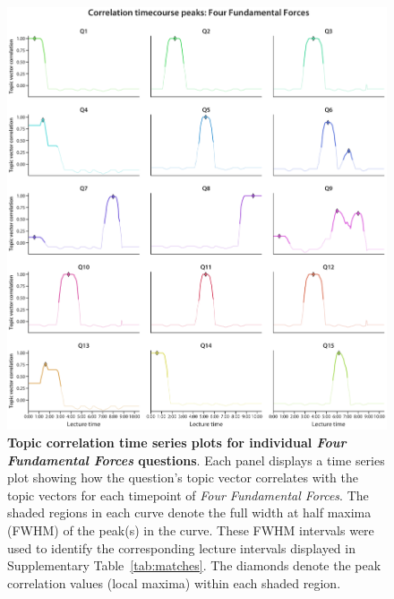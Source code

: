 \documentclass[10pt]{article}
\begin{document}
\begin{figure}[tp]
    \centering
    \includegraphics[width=\textwidth]{figs/forces-qcorrs-peaks}

    \caption{\textbf{Topic correlation time series plots for individual
    \textit{Four Fundamental Forces} questions}. Each panel displays a
    time series plot showing how the question's topic vector correlates with the
    topic vectors for each timepoint of \textit{Four Fundamental Forces}. The
    shaded regions in each curve denote the full width at half maxima (FWHM)
    of the peak(s) in the curve. These FWHM intervals were used to identify the
    corresponding lecture intervals displayed in Supplementary
    Table~\ref{tab:matches}. The diamonds denote the peak correlation values
    (local maxima) within each shaded region.}
    \label{fig:forces-peaks}
\end{figure}
\end{document}
